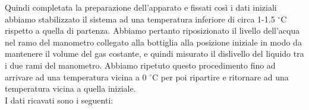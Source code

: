 Quindi completata la preparazione dell'apparato e fissati così i dati iniziali abbiamo stabilizzato il sistema ad una temperatura inferiore di circa 1-1.5 $^\circ$C rispetto a quella di partenza. Abbiamo pertanto riposizionato il livello dell'acqua nel ramo del manometro collegato alla bottiglia alla posizione iniziale in modo da mantenere il volume del gas costante, e quindi misurato il dislivello del liquido tra i due rami del manometro.
Abbiamo ripetuto questo procedimento fino ad arrivare ad una temperatura vicina a 0 $^\circ$C per poi ripartire e ritornare ad una temperatura vicina a quella iniziale.\\

I dati ricavati sono i seguenti:
